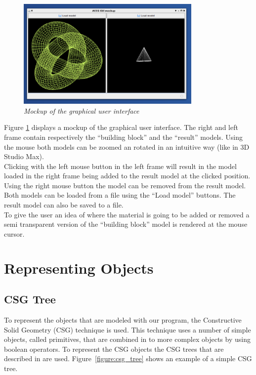 \documentclass[a4paper,10pt,twoside]{report}
\begin{document}
\begin{figure}[h]
\centering
\includegraphics[width = 0.8\textwidth]{../resources/gui_mockup/1}
\caption{\emph{Mockup of the graphical user interface}} \label{gui_mockup}
\end{figure}

Figure \ref{gui_mockup} displays a mockup of the graphical user interface. The right and left frame contain respectively the ``building block'' and the ``result'' models. Using the mouse both models can be zoomed an rotated in an intuitive way (like in 3D Studio Max).\\

Clicking with the left mouse button in the left frame will result in the model loaded in the right frame being added to the result model at the clicked position. Using the right mouse button the model can be removed from the result model. \\

Both models can be loaded from a file using the ``Load model'' buttons. The result model can also be saved to a file. \\

To give the user an idea of where the material is going to be added or removed a semi transparent version of the ``building block'' model is rendered at the mouse cursor.\\

\chapter{Representing Objects}
\label{chapt:repobj}

\section{CSG Tree}
    To represent the objects that are modeled with our program, the Constructive Solid Geometry (CSG) technique is used. This technique uses a number of simple objects, called primitives, that are combined in to more complex objects by using boolean operators. To represent the CSG objects the CSG trees that are described in \cite{Wiegand96} are used. Figure~\ref{figure:csg_tree} shows an example of a simple CSG tree.\\
\end{document}
